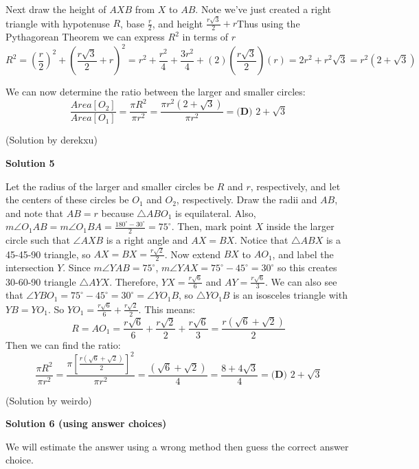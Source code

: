 \begin{enumerate}
 
Next draw the height of $AXB$ from $X$ to $AB$. Note we've just created a right triangle with hypotenuse $R$, base $\frac{r}{2}$, and height $\frac{r\sqrt{3}}{2} + r$Thus using the Pythagorean Theorem we can express $R^2$ in terms of $r$
 \[R^2 = (\frac{r}{2})^2 + (\frac{r\sqrt{3}}{2} + r)^2 = r^2 + \frac{r^2}{4} + \frac{3r^2}{4} + (2)(\frac{r\sqrt{3}}{2})(r) = 2r^2 + r^2\sqrt{3} = r^2(2 + \sqrt{3})\]

 We can now determine the ratio between the larger and smaller circles:
 \[\frac{Area [O_2]}{Area [O_1]} = \frac{\pi R^2}{\pi r^2} = \frac{\pi r^2(2 + \sqrt{3})}{\pi r^2} =\boxed{\textbf{(D) }  2 + \sqrt{3}}\]

 (Solution by derekxu)

 



\textbf{Solution 5}

Let the radius of the larger and smaller circles be $R$ and $r$, respectively, and let the centers of these circles be $O_1$ and $O_2$, respectively. Draw the radii and $AB$, and note that $AB=r$ because $\triangle ABO_1$ is equilateral. Also, $m\angle O_1AB = m\angle O_1BA = \frac{180^{\circ}-30^{\circ}}{2} = 75^{\circ}$. Then, mark point $X$ inside the larger circle such that $\angle AXB$ is a right angle and $AX = BX$. Notice that $\triangle ABX$ is a 45-45-90 triangle, so $AX = BX = \frac{r\sqrt{2}}{2}$. Now extend $BX$ to $AO_1$, and label the intersection $Y$. Since $m\angle YAB = 75^{\circ}$, $m\angle YAX = 75^{\circ} - 45^{\circ} = 30^{\circ}$ so this creates 30-60-90 triangle $\triangle AYX$. Therefore, $YX = \frac{r\sqrt{6}}{6}$ and $AY = \frac{r\sqrt{6}}{3}$. We can also see that $\angle YBO_1 = 75^{\circ}-45^{\circ} = 30^{\circ}=\angle YO_1B$, so $\triangle YO_1B$ is an isosceles triangle with $YB = YO_1$. So $YO_1 = \frac{r\sqrt{6}}{6} + \frac{r\sqrt{2}}{2}$. This means:
 \[R = AO_1 = \frac{r\sqrt{6}}{6} + \frac{r\sqrt{2}}{2} + \frac{r\sqrt{6}}{3} = \frac{r(\sqrt{6} + \sqrt{2})}{2}\]Then we can find the ratio:
 \[\frac{\pi R^2}{\pi r^2} = \frac{\pi [\frac{r(\sqrt{6} + \sqrt{2})}{2}]^2}{\pi r^2} = \frac{(\sqrt{6}+\sqrt{2})}{4}=\frac{8+4\sqrt{3}}{4}=\boxed{\textbf{(D) }  2 + \sqrt{3}}\]

 (Solution by weirdo)

 



\textbf{Solution 6 (using answer choices)}

We will estimate the answer using a wrong method then guess the correct answer choice.


\end{enumerate}
